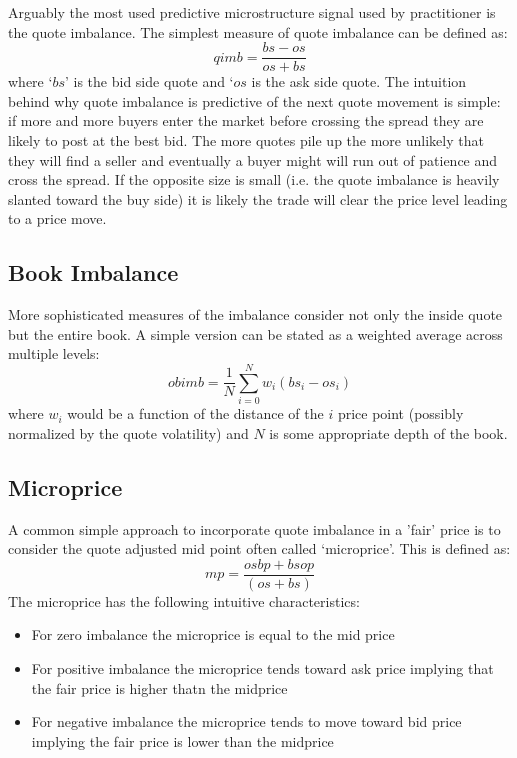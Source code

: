 Arguably the most used predictive microstructure signal used by practitioner is the quote imbalance.  The simplest measure of quote imbalance can be defined as: 
	\begin{equation}\label{eq:q_imb}
		qimb = \frac{bs - os}{os + bs}
	\end{equation}
where `$bs$' is the bid side quote and `$os$ is the ask side quote. The intuition behind why quote imbalance is predictive of the next quote movement is simple: if more and more buyers enter the market before crossing the spread they are likely to post at the best bid. The more quotes pile up the more unlikely that they will find a seller and eventually a buyer might will run out of patience and cross the spread. If the opposite size is small (i.e. the quote imbalance is heavily slanted toward the buy side) it is likely the trade will clear the price level leading to a price move.


\subsection{Book Imbalance}

More sophisticated measures of the imbalance consider not only the inside quote but the entire book. A simple version can be stated as a weighted average across multiple levels: 
	\begin{equation}\label{eq:microprc}
		obimb = \frac{1}{N}\sum_{i=0}^Nw_i (bs_i-os_i)
	\end{equation}
where $w_i$ would be a function of the distance of the $i$ price point (possibly normalized by the quote volatility) and $N$ is some appropriate depth of the book.


\subsection{Microprice}

A common simple approach to incorporate quote imbalance in a 'fair' price is to consider the quote adjusted mid point often called `microprice'. This is defined as:
	\begin{equation}\label{eqn:microprice}
		mp=\frac{os bp + bs op}{(os+bs)}
	\end{equation}
The microprice has the following intuitive characteristics: 
	\begin{itemize}
	\item For zero imbalance the microprice is equal to the mid price
	\item For positive imbalance the microprice tends toward ask price implying that the fair price is higher thatn the midprice
	\item For negative imbalance the microprice tends to move toward bid price implying the fair price is lower than the midprice
\end{itemize}

